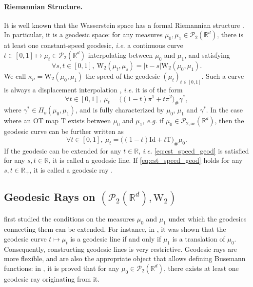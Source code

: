 \documentclass[twoside]{article}
\newcommand{\cP}{\mathcal{P}}
\newcommand{\cPa}{\mathcal{P}_{2,\mathrm{ac}}(\R^d)}
\newcommand{\W}{\mathrm{W}}
\newcommand{\R}{\mathbb{R}}
\newcommand{\T}{\mathrm{T}}
\newcommand{\id}{\mathrm{Id}}
\begin{document}
\paragraph{Riemannian Structure.}


 It is well known that the Wasserstein space has a formal Riemannian structure \citep{otto2001geometry}. In particular, it is a geodesic space: for any measures $\mu_0,\mu_1\in\cP_2(\R^d)$, there is at least one constant-speed geodesic, \emph{i.e.} a continuous curve $t\in [0,1]\mapsto \mu_t\in\cP_2(\R^d)$ interpolating between $\mu_0$ and $\mu_1$, and satisfying 
\begin{equation} \label{eq:cst_speed_geod}
    \forall s,t\in [0,1],\ \W_2(\mu_t,\mu_s) = |t-s| \W_2(\mu_0,\mu_1).
\end{equation}
We call $\kappa_\mu = \W_2(\mu_0, \mu_1)$ the speed of the geodesic $(\mu_t)_{t\in[0,1]}$. Such a curve is always a displacement interpolation \citep[Proposition 2.9]{bertrand2012geometric}, \emph{i.e.} it is of the form \citep{mccann1997convexity}
\begin{equation}
    \forall t\in [0,1],\ \mu_t = \big((1-t)\pi^1 + t \pi^2\big)_\#\gamma^*,
\end{equation}
where $\gamma^*\in\Pi_o(\mu_0,\mu_1)$, and is fully characterized by $\mu_0$, $\mu_1$ and $\gamma^*$. %
In the case where an OT map $\T$ exists between $\mu_0$ and $\mu_1$, \emph{e.g.} if $\mu_0\in \cPa$, %
then the geodesic curve can be further written as
\begin{equation}
    \forall t\in [0,1],\ \mu_t=\big((1-t)\id + t \T\big)_\#\mu_0.
\end{equation}
If the geodesic can be extended for any $t\in\R$, \emph{i.e.} \eqref{eq:cst_speed_geod} is satisfied for any $s,t\in\R$, it is called a geodesic line. If \eqref{eq:cst_speed_geod} holds for any $s,t\in\R_+$, it is called a geodesic ray \citep{bridson2013metric}.


\subsection{Geodesic Rays on $(\cP_2(\R^d),\W_2)$}

\citet{kloeckner2010geometric} first studied the conditions on the measures $\mu_0$ and $\mu_1$ under which the geodesics connecting them can be extended. For instance, in \citep[Proposition 3.6]{kloeckner2010geometric}, it was shown that the geodesic curve $t\mapsto \mu_t$ is a geodesic line if and only if %
$\mu_1$ is a translation of $\mu_0$. Consequently, constructing geodesic lines is very restrictive. Geodesic rays are more flexible, and are also the appropriate object that allows %
defining Busemann functions: in \citep{zhu2021busemann}, it is proved that for any $\mu_0\in\cP_2(\R^d)$, there exists at least one geodesic ray originating from it. 
\end{document}
